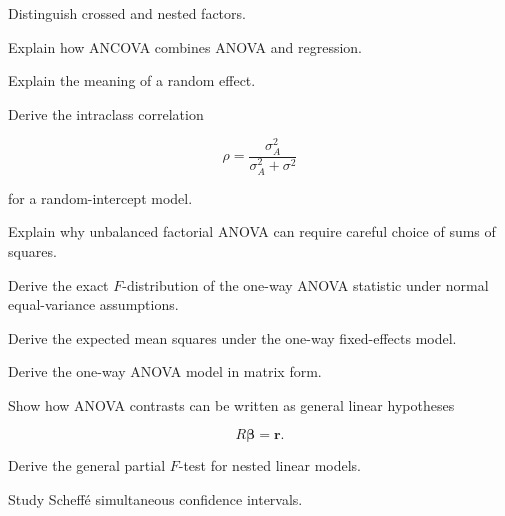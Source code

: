\begin{exercise}[3]
Distinguish crossed and nested factors.
\end{exercise}

\begin{exercise}[3]
Explain how ANCOVA combines ANOVA and regression.
\end{exercise}

\begin{exercise}[3]
Explain the meaning of a random effect.
\end{exercise}

\begin{exercise}[3]
Derive the intraclass correlation

\[
\rho
=
\frac{
\sigma_A^2
}{
\sigma_A^2+\sigma^2
}
\]

for a random-intercept model.
\end{exercise}

\begin{exercise}[3]
Explain why unbalanced factorial ANOVA can require careful choice of sums
of squares.
\end{exercise}

\begin{exercise}[4]
Derive the exact \(F\)-distribution of the one-way ANOVA statistic under
normal equal-variance assumptions.
\end{exercise}

\begin{exercise}[4]
Derive the expected mean squares under the one-way fixed-effects model.
\end{exercise}

\begin{exercise}[4]
Derive the one-way ANOVA model in matrix form.
\end{exercise}

\begin{exercise}[4]
Show how ANOVA contrasts can be written as general linear hypotheses

\[
R\boldsymbol{\beta}
=
\mathbf{r}.
\]
\end{exercise}

\begin{exercise}[4]
Derive the general partial \(F\)-test for nested linear models.
\end{exercise}

\begin{exercise}[4]
Study Scheff\'e simultaneous confidence intervals.
\end{exercise}

